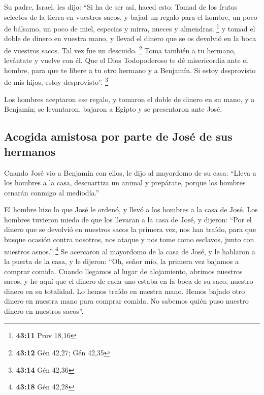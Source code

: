 \begin{paracol}{2}
 Su padre, Israel, les dijo: ``Si ha de ser así, haced
esto: Tomad de los frutos selectos de la tierra en vuestros sacos, y
bajad un regalo para el hombre, un poco de bálsamo, un poco de miel,
especias y mirra, nueces y almendras; \footnote{\textbf{43:11} Prov
  18,16}  y tomad el doble de dinero en vuestra mano, y
llevad el dinero que se os devolvió en la boca de vuestros sacos. Tal
vez fue un descuido. \footnote{\textbf{43:12} Gén 42,27; Gén 42,35}
 Toma también a tu hermano, levántate y vuelve con él.
 Que el Dios Todopoderoso te dé misericordia ante el
hombre, para que te libere a tu otro hermano y a Benjamín. Si estoy
desprovisto de mis hijos, estoy desprovisto''. \footnote{\textbf{43:14}
  Gén 42,36}

 Los hombres aceptaron ese regalo, y tomaron el doble de
dinero en su mano, y a Benjamín; se levantaron, bajaron a Egipto y se
presentaron ante José.

\hypertarget{acogida-amistosa-por-parte-de-josuxe9-de-sus-hermanos}{%
\subsection{Acogida amistosa por parte de José de sus
hermanos}\label{acogida-amistosa-por-parte-de-josuxe9-de-sus-hermanos}}

 Cuando José vio a Benjamín con ellos, le dijo al
mayordomo de su casa: ``Lleva a los hombres a la casa, descuartiza un
animal y prepárate, porque los hombres cenarán conmigo al mediodía.''

 El hombre hizo lo que José le ordenó, y llevó a los
hombres a la casa de José.  Los hombres tuvieron miedo de
que los llevaran a la casa de José, y dijeron: ``Por el dinero que se
devolvió en nuestros sacos la primera vez, nos han traído, para que
busque ocasión contra nosotros, nos ataque y nos tome como esclavos,
junto con nuestros asnos.'' \footnote{\textbf{43:18} Gén 42,28}
 Se acercaron al mayordomo de la casa de José, y le
hablaron a la puerta de la casa,  y le dijeron: ``Oh,
señor mío, la primera vez bajamos a comprar comida. 
Cuando llegamos al lugar de alojamiento, abrimos nuestros sacos, y he
aquí que el dinero de cada uno estaba en la boca de su saco, nuestro
dinero en su totalidad. Lo hemos traído en nuestra mano. 
Hemos bajado otro dinero en nuestra mano para comprar comida. No sabemos
quién puso nuestro dinero en nuestros sacos''.


\end{paracol}
